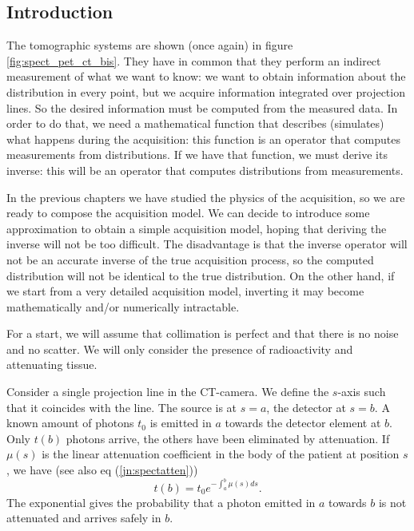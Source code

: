 \documentclass[11pt,oneside]{article}
\begin{document}
\subsection{Introduction}
The tomographic systems are shown (once again) in figure
\ref{fig:spect_pet_ct_bis}. They have in common that they perform an indirect
measurement of what we want to know: we want to obtain information about the
distribution in every point, but we acquire information integrated over
projection lines. So the desired information must be computed from the
measured data. In order to do that, we need a mathematical function that
describes (simulates) what happens during the acquisition: this function is an
operator that computes measurements from distributions. If we have that
function, we must derive its inverse: this will be an operator that computes
distributions from measurements.

In the previous chapters we have studied the physics of the acquisition, so we
are ready to compose the acquisition model. We can decide to introduce some
approximation to obtain a simple acquisition model, hoping that deriving the
inverse will not be too difficult. The disadvantage is that the inverse
operator will not be an accurate inverse of the true acquisition process, so
the computed distribution will not be identical to the true distribution. On
the other hand, if we start from a very detailed acquisition model, inverting
it may become mathematically and/or numerically intractable.

For a start, we will assume that collimation is perfect and that there is no
noise and no scatter. We will only consider the presence of radioactivity
and attenuating tissue.

Consider a single projection line in the CT-camera. We define the $s$-axis
such that it coincides with the line. The source is at $s=a$, the detector at
$s = b$. A known amount of photons $t_0$ is emitted in $a$ towards the
detector element at $b$. Only $t(b)$ photons arrive, the others have been
eliminated by attenuation. If $\mu(s)$ is the linear attenuation coefficient
in the body of the patient at position $s$, we have (see also eq
(\ref{jn:spectatten}))
\begin{equation}
  t(b) = t_0 e^{- \int_a^b \mu(s) ds}. \label{eq:ct_proj}
\end{equation}
The exponential gives the probability that a photon emitted in $a$ towards $b$
is not attenuated and arrives safely in $b$.
\end{document}
